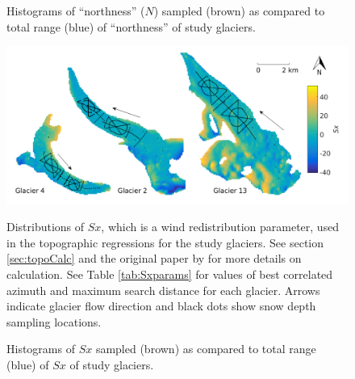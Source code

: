 \documentclass[12pt]{article}
\newcommand{\topomap}{Arrows indicate glacier flow direction and black dots show snow depth sampling locations. }
\begin{document}
\begin{figure}[H]
	\caption{Histograms of ``northness'' ($N$) sampled (brown) as compared to total range (blue) of ``northness'' of study glaciers.}
	\label{sampledRange:northness}
\end{figure}

\begin{figure}[H]
	\centering
	\includegraphics[width=\textwidth]{Map_Sx.png}\\
	\caption{Distributions of $Sx$, which is a wind redistribution parameter, used in the topographic regressions for the study glaciers. See section \ref{sec:topoCalc} and the original paper by \cite{Winstral2002} for more details on calculation. See Table \ref{tab:Sxparams} for values of best correlated azimuth and maximum search distance for each glacier. \topomap}
	\label{map:Sx}
\end{figure}

\begin{figure}[H]
	\caption{Histograms of $Sx$ sampled (brown) as compared to total range (blue) of $Sx$ of study glaciers.}
	\label{sampledRange:Sx}
\end{figure}
\end{document}
